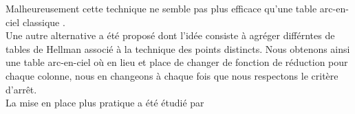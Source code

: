 	Malheureusement cette technique ne semble pas plus efficace qu'une table arc-en-ciel classique \cite{VDP,Wang}.\\
	Une autre alternative a été proposé \cite{fuzzy} dont l'idée consiste à agréger différntes de tables de Hellman associé à la technique des points distincts. Nous obtenons ainsi une table arc-en-ciel où en lieu et place de changer de fonction de réduction pour chaque colonne, nous en changeons à chaque fois que nous respectons le critère d'arrêt.\\

	La mise en place plus pratique a été étudié par \cite{fuzzyStudy}
	
\endinput{}
